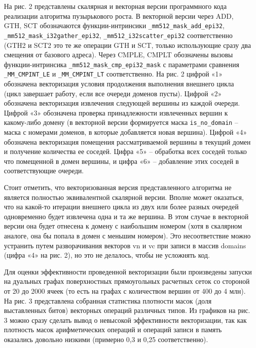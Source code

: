 \documentclass[
11pt,%
tightenlines,%
twoside,%
onecolumn,%
nofloats,%
nobibnotes,%
nofootinbib,%
superscriptaddress,%
noshowpacs,%
centertags]%
{revtex4}
\begin{document}
На рис. 2 представлены скалярная и векторная версии программного кода реализации алгоритма пузырькового роста.
В векторной версии через ADD, GTH, SCT обозначаются функции-интринсики \texttt{\_mm512\_mask\_add\_epi32}, \texttt{\_mm512\_mask\_i32gather\_epi32}, \texttt{\_mm512\_i32scatter\_epi32} соответственно (GTH2 и SCT2 это те же операции GTH и SCT, только использующие сразу два смещения от базового адреса).
Через CMPLE, CMPLT обозначены вызовы функции-интринсика \texttt{\_mm512\_mask\_cmp\_epi32\_mask} с параметрами сравнения \texttt{\_MM\_CMPINT\_LE} и \texttt{\_MM\_CMPINT\_LT} соответственно.
На рис. 2 цифрой «1» обозначена векторизация условия продолжения выполнения внешнего цикла (цикл завершает работу, если все очереди доменов пусты).
Цифрой «2» обозначена векторизация извлечения следующей вершины из каждой очереди.
Цифрой «3» обозначена проверка принадлежности извлеченных вершин к какому-либо домену (в векторной версии формируется маска \texttt{is\_no\_domain} -- маска с номерами доменов, в которые добавляется новая вершина).
Цифрой «4» обозначена векторизация помещения рассматриваемой вершины в текущий домен и получение количества ее соседей.
Цифра «5» -- обработка всех соседей только что помещенной в домен вершины, и цифра «6» -- добавление этих соседей в соответствующие очереди.

Стоит отметить, что векторизованная версия представленного алгоритма не является полностью эквивалентной скалярной версии.
Вполне может оказаться, что на какой-то итерации внешнего цикла из двух или более разных очередей одновременно будет извлечена одна и та же вершина.
В этом случае в векторной версии она будет отнесена к домену с наибольшим номером (хотя в скалярном аналоге, она бы попала в домен с меньшим номером).
Это несоответствие можно устранить путем разворачивания векторов vn и vc при записи в массив domains (цифра «4» на рис. 2), но это не делалось, чтобы не усложнять код.

Для оценки эффективности проведенной векторизации были произведены запуски на дуальных графах поверхностных прямоугольных расчетных сеток со стороной от 20 до 2000 ячеек (то есть на графах с количеством вершин от 400 до 4 млн).
На рис. 3 представлена собранная статистика плотности масок (доля выставленных битов) векторных операций различных типов.
Из графиков на рис. 3 можно сразу сделать вывод о невысокой эффективности векторизации, так как плотность масок арифметических операций и операций записи в память оказались довольно низкими (примерно 0,3 и 0,25 соответственно).
\end{document}
